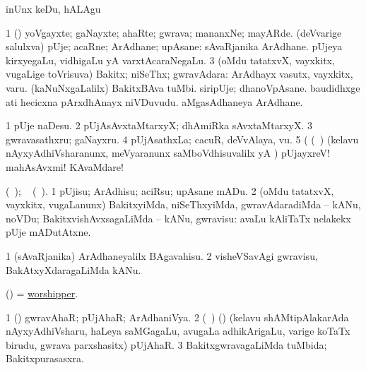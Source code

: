 \noindent
\gl{\akirx}
\expl{}
\bmng
inUnx keDu, hALAgu 
\emng
\eentry

\bentry 
{} 
\gl{\nA}
\expl{}
\bmng
\bnum
\num{1} (\pArxparx) yoVgayxte; gaNayxte; ahaRte; gwrava; mananxNe; mayARde. 
\banum
{} (deVvarige salulxva) pUje; acaRne; ArAdhane; upAsane:  sAvaRjanika ArAdhane. 
 pUjeya kirxyegaLu, vidhigaLu yA varxtAcaraNegaLu. 
\eanum
\numie
\num{3} (oMdu tatatxvX, vayxkitx, \mo vugaLige toVrisuva) Bakitx; niSeThx; gwravAdara:  ArAdhayx vasutx, vayxkitx, \mo varu.  (kaNuNxgaLalilx) BakitxBAva tuMbi.  siripUje; dhanoVpAsane.  baudidhxge ati hecicxna pArxdhAnayx niVDuvudu.  aMgasAdhaneya ArAdhane. 
\enum
\emng

\noindent
\gl{\pagu}
\expl{}
\bmng
\bnum
\num{1}  pUje naDesu. 
\num{2}  pUjAsAvxtaMtarxyX; dhAmiRka sAvxtaMtarxyX. 
\num{3}  gwravasathxru; gaNayxru. 
\num{4}  pUjAsathxLa; cacuR, deVvAlaya, \mo vu. 
\num{5}  (    (\kanmu\ \birx) (kelavu nAyxyAdhiVsharanunx, meVyaranunx saMboVdhisuvalilx yA \hA) pUjayxreV! mahAsAvxmi! KAvaMdare! 
\enum
\emng
\eentry

\bentry 
{} 
\gl{\sakirx}
\expl{\eng{[} \BU\ matutx \BUkaq}
  (\ame\ ); \vakaq\  (\ame\ )\eng{]}.\bmng
\bnum
\num{1} pUjisu; ArAdhisu; aciRsu; upAsane mADu. 
\num{2} (oMdu tatatxvX, vayxkitx, \mo vugaLanunx) BakitxyiMda, niSeThxyiMda, gwravAdaradiMda -- kANu, noVDu; BakitxvishAvxsagaLiMda -- kANu, gwravisu:  avaLu kAliTaTx nelakekx pUje mADutAtxne. 
\enum
\emng

\noindent
\gl{\akirx}
\expl{}
\bmng
\bnum
\num{1} (sAvaRjanika) ArAdhaneyalilx BAgavahisu. 
\num{2} visheVSavAgi gwravisu, BakAtxyXdaragaLiMda kANu. 
\enum
\emng
\eentry

\bentry
{} 
\gl{\nA}
\expl{}
\bmng
(\ame) = \hyperlink{worshipper}{worshipper}. 
\emng
\eentry

\bentry
{} 
\gl{\gu}
\expl{}
\bmng
\bnum
\num{1} (\pArxparx) gwravAhaR; pUjAhaR; ArAdhaniVya. 
\num{2} (\sA\ ) (\birx) (kelavu shAMtipAlakarAda nAyxyAdhiVsharu, haLeya saMGagaLu, avugaLa adhikArigaLu, \mo varige koTaTx birudu, gwrava parxshasitx) pUjAhaR. 
\num{3} BakitxgwravagaLiMda tuMbida; Bakitxpurasasxra. 
\enum
\emng
\eentry

